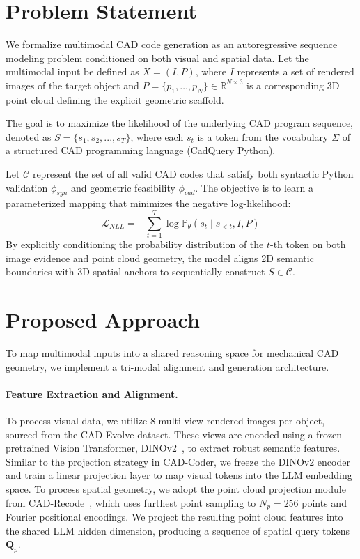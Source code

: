 \documentclass{article}
\begin{document}
\section{Problem Statement}
We formalize multimodal CAD code generation as an autoregressive sequence modeling problem conditioned on both visual and spatial data. Let the multimodal input be defined as $X = (I, P)$, where $I$ represents a set of rendered images of the target object and $P = \{p_1, \dots, p_N\} \in \mathbb{R}^{N \times 3}$ is a corresponding 3D point cloud defining the explicit geometric scaffold.

The goal is to maximize the likelihood of the underlying CAD program sequence, denoted as $S = \{s_1, s_2, ..., s_T\}$, where each $s_t$ is a token from the vocabulary $\Sigma$ of a structured CAD programming language (CadQuery Python).

Let $\mathcal{C}$ represent the set of all valid CAD codes that satisfy both syntactic Python validation $\phi_{syn}$ and geometric feasibility $\phi_{cad}$. The objective is to learn a parameterized mapping that minimizes the negative log-likelihood:
\begin{equation}
\mathcal{L}_{NLL} = - \sum_{t=1}^{T} \log \mathbb{P}_{\theta}(s_t \mid s_{<t}, I, P)
\end{equation}
By explicitly conditioning the probability distribution of the $t$-th token on both image evidence and point cloud geometry, the model aligns 2D semantic boundaries with 3D spatial anchors to sequentially construct $S \in \mathcal{C}$.

\section{Proposed Approach}
To map multimodal inputs into a shared reasoning space for mechanical CAD geometry, we implement a tri-modal alignment and generation architecture.

\paragraph{Feature Extraction and Alignment.}
To process visual data, we utilize 8 multi-view rendered images per object, sourced from the CAD-Evolve dataset. These views are encoded using a frozen pretrained Vision Transformer, DINOv2~\cite{oquab2023dinov2}, to extract robust semantic features. Similar to the projection strategy in CAD-Coder, we freeze the DINOv2 encoder and train a linear projection layer to map visual tokens into the LLM embedding space. To process spatial geometry, we adopt the point cloud projection module from CAD-Recode~\cite{cadrecode}, which uses furthest point sampling to $N_p = 256$ points and Fourier positional encodings. We project the resulting point cloud features into the shared LLM hidden dimension, producing a sequence of spatial query tokens $\mathbf{Q}_p$.
\end{document}
